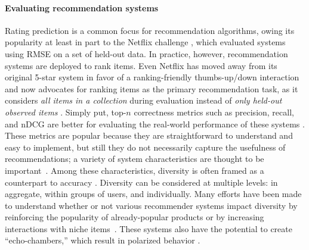 \documentclass[sigconf]{acmart}
\begin{document}
\paragraph{Evaluating recommendation systems} 
Rating prediction is a common focus for recommendation algorithms, owing its popularity at least in part to the Netflix challenge \cite{bennett2007netflix,bell2007lessons}, which evaluated systems using RMSE on a set of held-out data.  In practice, however, recommendation systems are deployed to rank items.  Even Netflix has moved away from its original 5-star system in favor of a ranking-friendly thumbs-up/down interaction~\cite{youtubeThumbs} and now advocates for ranking items as the primary recommendation task, as it considers \emph{all items in a collection} during evaluation instead of \emph{only held-out observed items} \cite{steck2013evaluation}.
Simply put, top-$n$ correctness metrics such as precision, recall, and nDCG are better for evaluating the real-world performance of these systems \cite{cremonesi2010performance}.
These metrics are popular because they are straightforward to understand and easy to implement, but still they do not necessarily capture the usefulness of recommendations; a variety of system characteristics are thought to be important~\cite{herlocker2004evaluating}.
Among these characteristics, diversity is often framed as a counterpart to accuracy \cite{zhou2010solving,javari2015probabilistic,liu2012solving}.
Diversity can be considered at multiple levels: in aggregate, within groups of users, and individually.  Many efforts have been made to understand whether or not various recommender systems impact diversity by reinforcing the popularity of already-popular products or by increasing interactions with niche items~\cite{fleder2009blockbuster,anderson2006long,celma2008hits,park2008long,zeng2015modeling,dan2013long}.
These systems also have the potential to create ``echo-chambers,'' which result in polarized behavior \cite{dandekar2013biased}.
\end{document}

